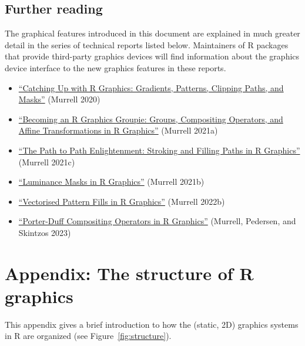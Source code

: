 \hypertarget{further-reading}{%
\subsection{Further reading}\label{further-reading}}

The graphical features introduced in this document are explained in much greater
detail in the series of technical reports listed below.
Maintainers of R packages that provide third-party graphics devices
will find information about the graphics device interface to the new
graphics features in these reports.

\begin{itemize}
\item
  \href{https://stattech.blogs.auckland.ac.nz/2020/07/14/2020-04-catching-up-with-r-graphics/}{``Catching Up with R Graphics: Gradients, Patterns, Clipping Paths, and Masks''} (Murrell 2020)
\item
  \href{https://stattech.blogs.auckland.ac.nz/2021/11/15/2021-02-groups-compositing-operators-and-affine-transformations-in-r-graphics}{``Becoming an R Graphics Groupie: Groups, Compositing Operators, and Affine Transformations in R Graphics''} (Murrell 2021a)
\item
  \href{https://stattech.blogs.auckland.ac.nz/2021/11/16/2021-03-stroking-and-filling-paths-in-r-graphics}{``The Path to Path Enlightenment: Stroking and Filling Paths in R Graphics''} (Murrell 2021c)
\item
  \href{https://stattech.blogs.auckland.ac.nz/2021/12/01/2021-04-luminance-masks-in-r-graphics}{``Luminance Masks in R Graphics''} (Murrell 2021b)
\item
  \href{https://stattech.wordpress.fos.auckland.ac.nz/2022/06/01/2022-01-vectorised-pattern-fills-in-r-graphics/}{``Vectorised Pattern Fills in R Graphics''} (Murrell 2022b)
\item
  \href{https://stattech.wordpress.fos.auckland.ac.nz/2023/05/22/2023-02-porter-duff-compositing-operators-in-r-graphics/}{``Porter-Duff Compositing Operators in R Graphics''} (Murrell, Pedersen, and Skintzos 2023)
\end{itemize}

\hypertarget{rgraphics}{%
\section{Appendix: The structure of R graphics}\label{rgraphics}}

This appendix gives a brief introduction to how the (static, 2D)
graphics systems
in R are organized (see Figure~\ref{fig:structure}).

